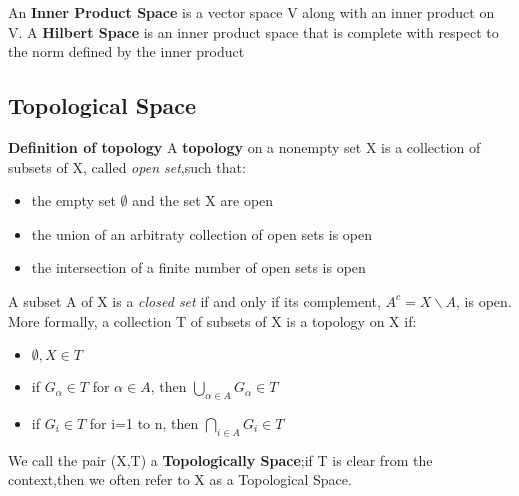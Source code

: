 \documentclass[UTF8]{article} %
\begin{document}
An \textbf{Inner Product Space} is a vector space V along with an inner product on V. A \textbf{Hilbert Space} is an inner product space that is complete with respect to the norm defined by the inner product

\subsection{Topological Space}

\textbf{Definition of topology} A \textbf{topology} on a nonempty set X is a collection of subsets of X, called \textit{open set},such that:
\begin{itemize}
    \item the empty set $\emptyset$ and the set X are open
    \item the union of an arbitraty collection of open sets is open
    \item the intersection of a finite number of open sets is open
\end{itemize}
A subset A of X is a \textit{closed set} if and only if its complement, $A^c = X\backslash A$, is open.
More formally, a collection T of subsets of X is a topology on X if:
\begin{itemize}
    \item $\emptyset,X \in T$
    \item if $G_{\alpha}\in T$ for $\alpha \in A$, then $\bigcup_{\alpha \in A}G_{\alpha}\in T$
    \item if $G_{i}\in T$ for i=1 to n, then $\bigcap _{i \in A}G_{i}\in T$
\end{itemize}
We call the pair (X,T) a \textbf{Topologically Space};if T is clear from the context,then we often refer to X as a Topological Space.
\end{document}

